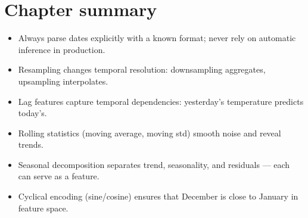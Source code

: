 \section{Chapter summary}

\begin{itemize}
  \item Always parse dates explicitly with a known format; never rely on automatic inference in production.
  \item Resampling changes temporal resolution: downsampling aggregates, upsampling interpolates.
  \item Lag features capture temporal dependencies: yesterday's temperature predicts today's.
  \item Rolling statistics (moving average, moving std) smooth noise and reveal trends.
  \item Seasonal decomposition separates trend, seasonality, and residuals --- each can serve as a feature.
  \item Cyclical encoding (sine/cosine) ensures that December is close to January in feature space.
\end{itemize}
